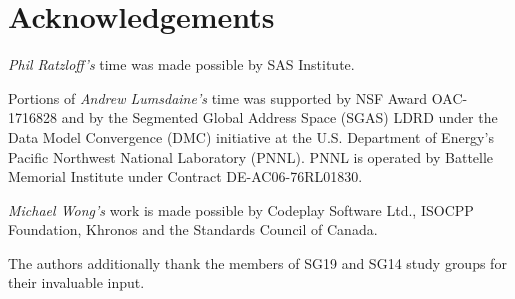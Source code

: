 
\chapter*{Acknowledgements}

\textit{Phil Ratzloff's} time was made possible by SAS Institute.

Portions of \textit{Andrew Lumsdaine's} time was supported by NSF Award OAC-1716828 and by the
Segmented Global Address Space (SGAS) LDRD under the Data Model Convergence (DMC)
initiative at the U.S. Department of Energy's Pacific Northwest National Laboratory
(PNNL). PNNL is operated by Battelle Memorial Institute under Contract
DE-AC06-76RL01830.

\textit{Michael Wong's} work is made possible by Codeplay Software Ltd., ISOCPP Foundation, Khronos and the Standards Council of Canada.  

The authors additionally thank the members of SG19 and SG14 study groups for their invaluable input.
